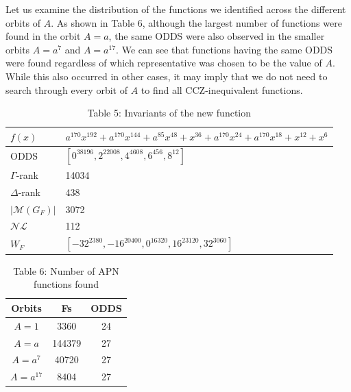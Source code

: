 \documentclass[10pt]{article}
\begin{document}
Let us examine the distribution of the functions we identified across the different orbits of $A$. As shown in Table 6, although the largest number of functions were found in the orbit $A=a$, the same ODDS were also observed in the smaller orbits $A=a^{7}$ and $A=a^{17}$. We can see that functions having the same ODDS were found regardless of which representative was chosen to be the value of $A$. While this also occurred in other cases, it may imply that we do not need to search through every orbit of $A$ to find all CCZ-inequivalent functions.

\begin{table}[h]
\begin{center}
\begin{tabular}{|l|l|}
\hline
$f(x)$ & $a^{170} x^{192}+a^{170} x^{144}+a^{85} x^{48}+x^{36}+a^{170} x^{24}+a^{170} x^{18}+x^{12}+x^{6}$ \\
\hline
ODDS & $\left[0^{38196}, 2^{22008}, 4^{4608}, 6^{456}, 8^{12}\right]$ \\
\hline
$\Gamma$-rank & 14034 \\
\hline
$\Delta$-rank & 438 \\
\hline
$\left|\mathcal{M}\left(G_{F}\right)\right|$ & 3072 \\
\hline
$\mathcal{N} \mathcal{L}$ & 112 \\
\hline
$W_{F}$ & $\left[-32^{2380},-16^{20400}, 0^{16320}, 16^{23120}, 32^{3060}\right]$ \\
\hline
\end{tabular}
\captionsetup{labelformat=empty}
\caption{Table 5: Invariants of the new function}
\end{center}
\end{table}

\begin{table}[h]
\begin{center}
\begin{tabular}{c|c|c}
Orbits & Fs & ODDS \\
\hline
$A=1$ & 3360 & 24 \\
$A=a$ & 144379 & 27 \\
$A=a^{7}$ & 40720 & 27 \\
$A=a^{17}$ & 8404 & 27 \\
\end{tabular}
\captionsetup{labelformat=empty}
\caption{Table 6: Number of APN functions found}
\end{center}
\end{table}
\end{document}

